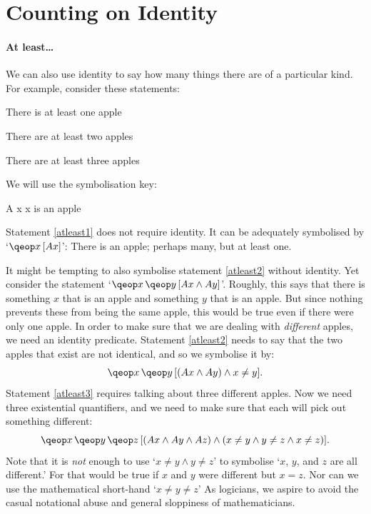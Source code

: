 \documentclass[PHIL101-Textbook.tex]{subfiles}
\begin{document}
\pagebreak
\section{Counting on Identity}\label{s.counting}

\paragraph{At least\ldots}

\begin{center}
  \href{https://youtu.be/BvwJ69VBXZg}
  {}
\end{center}

We can also use identity to say how many things there are of a particular kind. For example, consider these statements:
\begin{earg}
\item[\ex{atleast1}] There is at least one apple
\item[\ex{atleast2}] There are at least two apples
\item[\ex{atleast3}] There are at least three apples
\end{earg}
We will use the symbolisation key:
	\begin{ekey}
		\item[\atom A x ] x is an apple
	\end{ekey}
Statement \ref{atleast1} does not require identity. It can be adequately symbolised by `$\qeb{x}{\atom A x }$': There is an apple; perhaps many, but at least one.

It might be tempting to also symbolise statement \ref{atleast2} without identity. Yet consider the statement `$\qe{x}{\qeb{y}{\atom A x  \eand \atom A y}}$'. Roughly, this says that there is something $x$ that is an apple and something $y$ that is an apple. But since nothing prevents these from being the same apple, this would be true even if there were only one apple. In order to make sure that we are dealing with \emph{different} apples, we need an identity predicate. Statement \ref{atleast2} needs to say that the two apples that exist are not identical, and so we symbolise it by:
\[
	\qe{x}{\qeb{y}{(\atom A x  \eand \atom A y) \eand x \neq y}}.
\]
Statement \ref{atleast3} requires talking about three different apples. Now we need three existential quantifiers, and we need to make sure that each will pick out something different: 
\[
	\qe{x}{\qe{y}{\qeb{z}{(\atom A x  \eand \atom A y \eand \atom A z) \eand (x\neq y \eand y \neq z \eand x\neq z)}}}.
\]
Note that it is \emph{not} enough to use `$x\neq y \land y\neq z$' to symbolise `$x$, $y$, and $z$ are all different.' For that would be true if $x$ and $y$ were different but $x = z$. Nor can we use the mathematical short-hand `$x\neq y \neq z$' As logicians, we aspire to avoid the casual notational abuse and general sloppiness of mathematicians.
\end{document}
